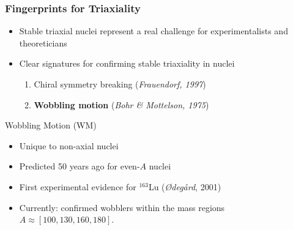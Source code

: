 \documentclass{beamer}
\begin{document}
\begin{frame}
  \frametitle{Fingerprints for Triaxiality}
  \begin{itemize}
    \item Stable triaxial nuclei represent a real challenge for experimentalists and theoreticians
    \item Clear signatures for confirming stable triaxiality in nuclei
    \begin{enumerate}
      \item Chiral symmetry breaking (\textit{Frauendorf, 1997})
      \item \textbf{Wobbling motion} (\textit{Bohr \& Mottelson, 1975})
    \end{enumerate}
  \end{itemize}
  \begin{block}{Wobbling Motion (WM)}
    \begin{itemize}
      \item Unique to non-axial nuclei
      \item Predicted 50 years ago for even-$A$ nuclei
      \item First experimental evidence for $^{163}$Lu (\textit{Ødegård}, 2001)
      \item Currently: confirmed wobblers within the mass regions $A\approx[100,130,160,180]$.
    \end{itemize}
  \end{block}
\end{frame}
\end{document}
